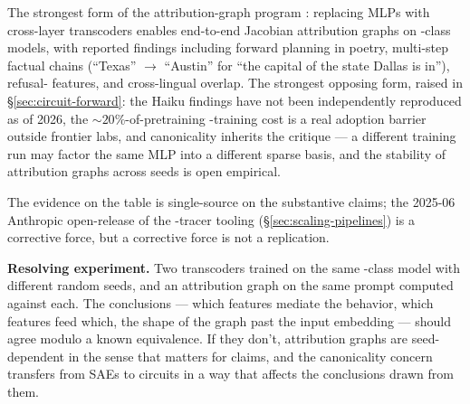 The strongest form of the attribution-graph program
\citep{lindsey2025-circuit-tracing,lindsey2025-biology}: replacing
MLPs with cross-layer transcoders enables end-to-end Jacobian
attribution graphs on -class models, with reported findings
including forward planning in poetry, multi-step factual chains
(``Texas'' $\to$ ``Austin'' for ``the capital of the state Dallas is
in''), refusal- features, and cross-lingual  overlap.
The strongest opposing form, raised in \S\ref{sec:circuit-forward}:
the Haiku findings have not been independently reproduced as of 2026,
the $\sim\!20\%$-of-pretraining -training cost is a real
adoption barrier outside frontier labs, and  canonicality
inherits the \citet{leask2025-sae-not-canonical,dunefsky2024-transcoders}
critique --- a different  training run may factor the same
MLP into a different sparse basis, and the stability of attribution
graphs across  seeds is open empirical.

The evidence on the table is single-source on the substantive claims;
the 2025-06 Anthropic open-release of the -tracer tooling
(\S\ref{sec:scaling-pipelines}) is a corrective force, but a corrective
force is not a replication.

\textbf{Resolving experiment.} Two transcoders trained on the same
-class model with different random seeds, and an attribution
graph on the same prompt computed against each. The conclusions ---
which features mediate the behavior, which features feed which, the
shape of the graph past the input embedding --- should agree modulo a
known  equivalence. If they don't, attribution graphs are
seed-dependent in the sense that matters for  claims, and the
canonicality concern transfers from SAEs to circuits in a way that
affects the conclusions drawn from them.

